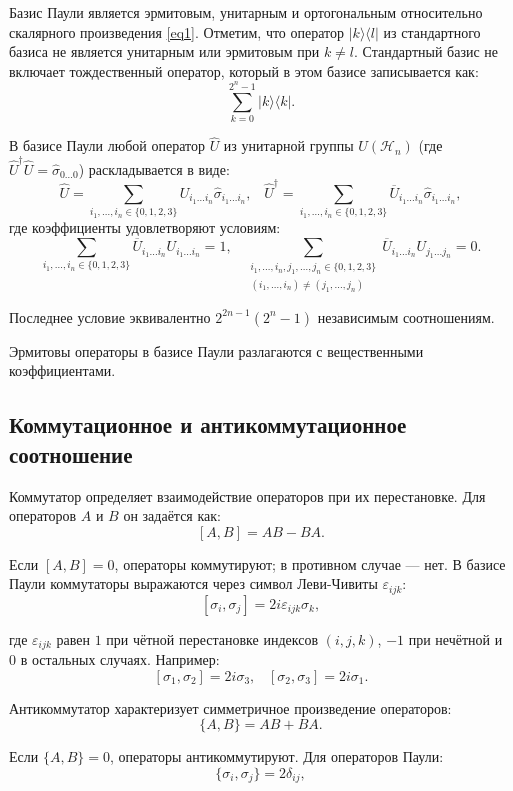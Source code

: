 \documentclass[a4paper]{report}
\begin{document}
Базис Паули является эрмитовым, унитарным и ортогональным относительно скалярного произведения \eqref{eq1}. Отметим, что оператор ${|k\rangle\langle l|}$ из стандартного базиса не является унитарным или эрмитовым при ${k \neq l}$. Стандартный базис не включает тождественный оператор, который в этом базисе записывается как:
$${
    \sum_{k=0}^{2^n-1} |k\rangle \langle k|.
}$$

В базисе Паули любой оператор ${\hat{U}}$ из унитарной группы ${U(\mathcal{H}_n)}$ (где $\hat{U}^\dagger\hat{U} = \hat{\sigma}_{0\ldots0}$) раскладывается в виде:
$${
    \hat{U} = \sum_{i_1,\ldots,i_n\in\{0,1,2,3\}} U_{i_1\ldots i_n}\hat{\sigma}_{i_1\ldots i_n},\;\;\;
    \hat{U}^\dagger = \sum_{i_1,\ldots,i_n\in\{0,1,2,3\}} \overline{U}_{i_1\ldots i_n}\hat{\sigma}_{i_1\ldots i_n},
}$$
где коэффициенты удовлетворяют условиям:
$${
    \sum_{i_1,\ldots,i_n\in\{0,1,2,3\}} \overline{U}_{i_1\ldots i_n}U_{i_1\ldots i_n} = 1,\;\;\;
    \sum_{\substack{
        i_1,\ldots,i_n,j_1,\ldots,j_n\in\{0,1,2,3\} \\
        (i_1,\ldots,i_n)\neq(j_1,\ldots,j_n)
    }} \overline{U}_{i_1\ldots i_n}U_{j_1\ldots j_n} = 0.
}$$

Последнее условие эквивалентно ${2^{2n-1}(2^n-1)}$ независимым соотношениям.

Эрмитовы операторы в базисе Паули разлагаются с вещественными коэффициентами.


\subsection{Коммутационное и антикоммутационное соотношение}

Коммутатор определяет взаимодействие операторов при их перестановке. Для операторов ${A}$ и ${B}$ он задаётся как:
$${[A, B] = AB - BA.}$$

\noindent Если ${[A, B] = 0}$, операторы коммутируют; в противном случае — нет. В базисе Паули коммутаторы выражаются через символ Леви-Чивиты ${\varepsilon_{ijk}}$:
$${[\sigma_i, \sigma_j] = 2i\varepsilon_{ijk}\sigma_k,}$$

\noindent где ${\varepsilon_{ijk}}$ равен $1$ при чётной перестановке индексов ${(i,j,k)}$, $-1$ при нечётной и $0$ в остальных случаях. Например:
$${[\sigma_1, \sigma_2] = 2i\sigma_3,\;\;\; [\sigma_2, \sigma_3] = 2i\sigma_1.}$$

Антикоммутатор характеризует симметричное произведение операторов:
$${\{A, B\} = AB + BA.}$$

\noindent Если ${\{A, B\} = 0}$, операторы антикоммутируют. Для операторов Паули:
$${\{\sigma_i, \sigma_j\} = 2\delta_{ij},}$$
\end{document}
